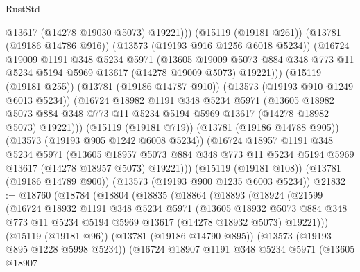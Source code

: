 \begin{lexlean}{RustStd}
\begin{coremodule}
                @13617
                (@14278 @19030 @5073)
                @19221)))
          (@15119 (@19181 @261))
          (@13781 (@19186 @14786 @916))
          (@13573 (@19193 @916 @1256 @6018 @5234))
          (@16724
            @19009
            @1191
            @348
            @5234
            @5971
            (@13605
              @19009
              @5073
              @884
              @348
              @773
              @11
              @5234
              @5194
              @5969
              @13617
              (@14278 @19009 @5073)
              @19221)))
        (@15119 (@19181 @255))
        (@13781 (@19186 @14787 @910))
        (@13573 (@19193 @910 @1249 @6013 @5234))
        (@16724
          @18982
          @1191
          @348
          @5234
          @5971
          (@13605
            @18982
            @5073
            @884
            @348
            @773
            @11
            @5234
            @5194
            @5969
            @13617
            (@14278 @18982 @5073)
            @19221)))
      (@15119 (@19181 @719))
      (@13781 (@19186 @14788 @905))
      (@13573 (@19193 @905 @1242 @6008 @5234))
      (@16724
        @18957
        @1191
        @348
        @5234
        @5971
        (@13605
          @18957
          @5073
          @884
          @348
          @773
          @11
          @5234
          @5194
          @5969
          @13617
          (@14278 @18957 @5073)
          @19221)))
    (@15119 (@19181 @108))
    (@13781 (@19186 @14789 @900))
    (@13573 (@19193 @900 @1235 @6003 @5234))
@21832 := @18760
    (@18784
      (@18804
        (@18835
          (@18864
            (@18893
              (@18924
                (@21599
                  (@16724
                    @18932
                    @1191
                    @348
                    @5234
                    @5971
                    (@13605
                      @18932
                      @5073
                      @884
                      @348
                      @773
                      @11
                      @5234
                      @5194
                      @5969
                      @13617
                      (@14278 @18932 @5073)
                      @19221)))
                (@15119 (@19181 @96))
                (@13781 (@19186 @14790 @895))
                (@13573 (@19193 @895 @1228 @5998 @5234))
                (@16724
                  @18907
                  @1191
                  @348
                  @5234
                  @5971
                  (@13605
                    @18907

\end{coremodule}
\end{lexlean}

